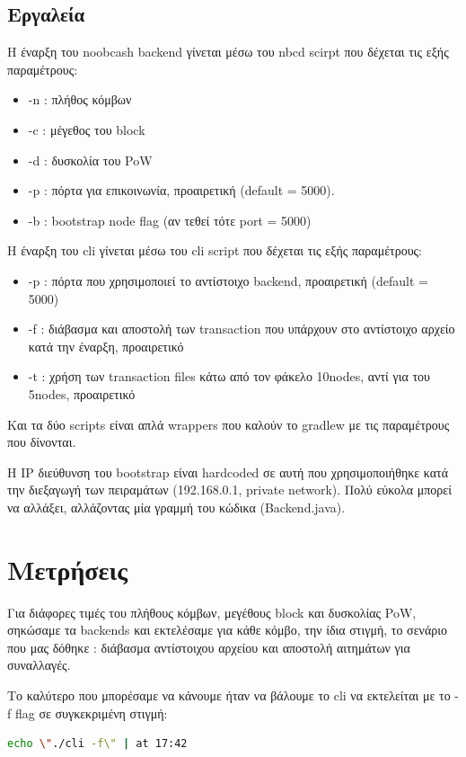 \documentclass[a4paper,oneside, 12pt]{article}
\begin{document}
\subsection{Εργαλεία}
Η έναρξη του noobcash backend γίνεται μέσω του nbcd scirpt που δέχεται τις εξής παραμέτρους:
\begin{itemize}
	\item -n : πλήθος κόμβων
	\item -c : μέγεθος του block
	\item -d : δυσκολία του PoW
	\item -p : πόρτα για επικοινωνία, προαιρετική (default = 5000).
	\item -b : bootstrap node flag (αν τεθεί τότε port = 5000)
\end{itemize}

Η έναρξη του cli γίνεται μέσω του cli script που δέχεται τις εξής παραμέτρους:
\begin{itemize}
	\item -p : πόρτα που χρησιμοποιεί το αντίστοιχο backend, προαιρετική (default = 5000)
	\item -f : διάβασμα και αποστολή των transaction που υπάρχουν στο αντίστοιχο αρχείο κατά την έναρξη, προαιρετικό
	\item -t : χρήση των transaction files κάτω από τον φάκελο 10nodes, αντί για του 5nodes, προαιρετικό
\end{itemize}

Και τα δύο scripts είναι απλά wrappers που καλούν το gradlew με τις παραμέτρους που δίνονται.

Η IP διεύθυνση του bootstrap είναι hardcoded σε αυτή που χρησιμοποιήθηκε κατά την διεξαγωγή των πειραμάτων (192.168.0.1, private network). Πολύ εύκολα μπορεί να αλλάξει, αλλάζοντας μία γραμμή του κώδικα (Backend.java).
\section{Μετρήσεις}
Για διάφορες τιμές του πλήθους κόμβων, μεγέθους block και δυσκολίας PoW, σηκώσαμε τα backends και εκτελέσαμε για κάθε κόμβο, την ίδια στιγμή, το σενάριο που μας δόθηκε : διάβασμα αντίστοιχου αρχείου και αποστολή αιτημάτων για συναλλαγές.

Το καλύτερο που μπορέσαμε να κάνουμε ήταν να βάλουμε το cli να εκτελείται με το -f flag σε συγκεκριμένη στιγμή:
\begin{lstlisting}[language=bash]
echo \"./cli -f\" | at 17:42
\end{lstlisting}
\end{document}
